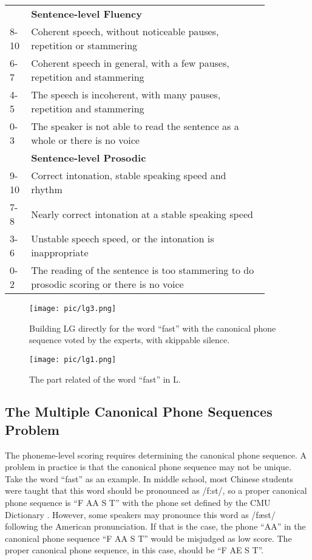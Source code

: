 \documentclass[a4paper]{article}
\begin{document}
\begin{table*}[t]
\begin{tabular}{p{0.05\linewidth}p{0.8\linewidth}}
    \hline
    ~                & \textbf{Sentence-level Fluency} \\
    8-10             & Coherent speech, without noticeable pauses, repetition or stammering \\
    6-7              & Coherent speech in general, with a few pauses, repetition and stammering \\
    4-5              & The speech is incoherent, with many pauses, repetition and stammering \\
    0-3              & The speaker is not able to read the sentence as a whole or there is no voice \\
    \hline
    ~                & \textbf{Sentence-level Prosodic} \\
    9-10             & Correct intonation, stable speaking speed and rhythm \\
    7-8              & Nearly correct intonation at a stable speaking speed \\
    3-6              & Unstable speech speed, or the intonation is inappropriate \\
    0-2              & The reading of the sentence is too stammering to do prosodic scoring or there is no voice \\
    \bottomrule
  \end{tabular}
\end{table*}

\begin{figure*}[t]
  \centering
  \texttt{[image: pic/lg3.png]}
  \caption{Building LG directly for the word ``fast'' with the canonical phone sequence voted by the experts, with skippable silence.}
  \label{fig:lg3}
\end{figure*}

\begin{figure}[t]
  \centering
  \texttt{[image: pic/lg1.png]}
  \caption{The part related of the word ``fast'' in L.}
  \label{fig:lg1}
\end{figure}

\subsection{The Multiple Canonical Phone Sequences Problem}
\label{sec:canonical}

The phoneme-level scoring requires determining the canonical phone sequence. A problem in practice is that the canonical phone sequence may not be unique. Take the word ``fast'' as an example. In middle school, most Chinese students were taught that this word should be pronounced as /f\textscripta :st/, so a proper canonical phone sequence is ``F AA S T'' with the phone set defined by the CMU Dictionary \cite{cmudict}. However, some speakers may pronounce this word as /f\ae st/ following the American pronunciation. If that is the case, the phone ``AA'' in the canonical phone sequence ``F AA S T'' would be misjudged as low score. The proper canonical phone sequence, in this case, should be ``F AE S T''.
\end{document}
